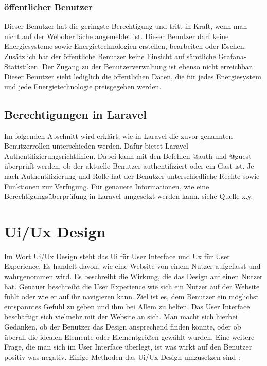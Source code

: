\subsubsection{öffentlicher Benutzer}
Dieser Benutzer hat die geringste Berechtigung und tritt in Kraft, wenn man nicht auf der Weboberfläche angemeldet ist. Dieser Benutzer darf keine Energiesysteme sowie Energietechnologien erstellen, bearbeiten oder löschen. Zusätzlich hat der öffentliche Benutzer keine Einsicht auf sämtliche Grafana-Statistiken. Der Zugang zu der Benutzerverwaltung ist ebenso nicht erreichbar. Dieser Benutzer sieht lediglich die öffentlichen Daten, die für jedes Energiesystem und jede Energietechnologie preisgegeben werden.

\subsection{Berechtigungen in Laravel}
Im folgenden Abschnitt wird erklärt, wie in Laravel die zuvor genannten Benutzerrollen unterschieden werden.
Dafür bietet Laravel Authentifizierungsrichtlinien. Dabei kann mit den Befehlen @auth und @guest überprüft werden, ob der aktuelle Benutzer authentifiziert oder ein Gast ist. Je nach Authentifizierung und Rolle hat der Benutzer unterschiedliche Rechte sowie Funktionen zur Verfügung.
Für genauere Informationen, wie eine Berechtigungsüberprüfung in Laravel umgesetzt werden kann, siehe Quelle x.y.



\section{Ui/Ux Design}
Im Wort Ui/Ux Design steht das Ui für User Interface und Ux für User Experience. Es handelt davon, wie eine Website von einem Nutzer aufgefasst und wahrgenommen wird. Es beschreibt die Wirkung, die das Design auf einen Nutzer hat. Genauer beschreibt die User Experience wie sich ein Nutzer auf der Website fühlt oder wie er auf ihr navigieren kann. 
Ziel ist es, dem Benutzer ein möglichst entspanntes Gefühl zu geben und ihm bei Allem zu helfen. Das User Interface beschäftigt sich vielmehr mit der Website an sich. Man macht sich hierbei Gedanken, ob der Benutzer das Design ansprechend finden könnte, oder ob überall die idealen Elemente oder Elementgrößen gewählt wurden. Eine weitere Frage, die man sich im User Interface überlegt, ist was wirkt auf den Benutzer positiv was negativ. Einige Methoden das Ui/Ux Design umzusetzen sind : 

